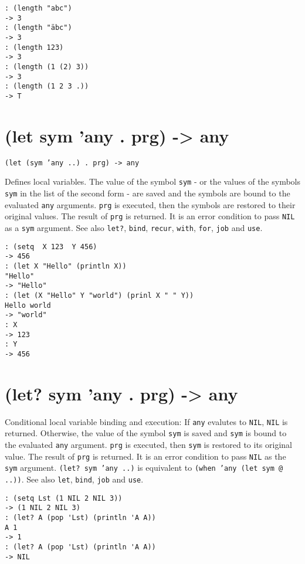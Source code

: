 {{{{{{\begin{verbatim}
: (length "abc")
-> 3
: (length "äbc")
-> 3
: (length 123)
-> 3
: (length (1 (2) 3))
-> 3
: (length (1 2 3 .))
-> T
\end{verbatim}

 
\section{(let sym 'any . prg) -> any}
\label{sec-8-1-12-10}


\texttt{(let (sym 'any ..) . prg) -> any}

Defines local variables. The value of the symbol \texttt{sym} - or the values
of the symbols \texttt{sym} in the list of the second form - are saved and the
symbols are bound to the evaluated \texttt{any} arguments. \texttt{prg} is executed,
then the symbols are restored to their original values. The result of
\texttt{prg} is returned. It is an error condition to pass \texttt{NIL} as a \texttt{sym}
argument. See also \texttt{let?}, \texttt{bind}, \texttt{recur}, \texttt{with}, \texttt{for}, \texttt{job} and
\texttt{use}.


\begin{verbatim}
: (setq  X 123  Y 456)
-> 456
: (let X "Hello" (println X))
"Hello"
-> "Hello"
: (let (X "Hello" Y "world") (prinl X " " Y))
Hello world
-> "world"
: X
-> 123
: Y
-> 456
\end{verbatim}

 
\section{(let? sym 'any . prg) -> any}
\label{sec-8-1-12-11}


Conditional local variable binding and execution: If \texttt{any} evalutes to
\texttt{NIL}, \texttt{NIL} is returned. Otherwise, the value of the symbol \texttt{sym} is
saved and \texttt{sym} is bound to the evaluated \texttt{any} argument. \texttt{prg} is
executed, then \texttt{sym} is restored to its original value. The result of
\texttt{prg} is returned. It is an error condition to pass \texttt{NIL} as the \texttt{sym}
argument. \texttt{(let? sym 'any ..)} is equivalent to
\texttt{(when 'any (let sym @ ..))}. See also \texttt{let}, \texttt{bind}, \texttt{job} and \texttt{use}.


\begin{verbatim}
: (setq Lst (1 NIL 2 NIL 3))
-> (1 NIL 2 NIL 3)
: (let? A (pop 'Lst) (println 'A A))
A 1
-> 1
: (let? A (pop 'Lst) (println 'A A))
-> NIL
\end{verbatim}

}}}}}}
